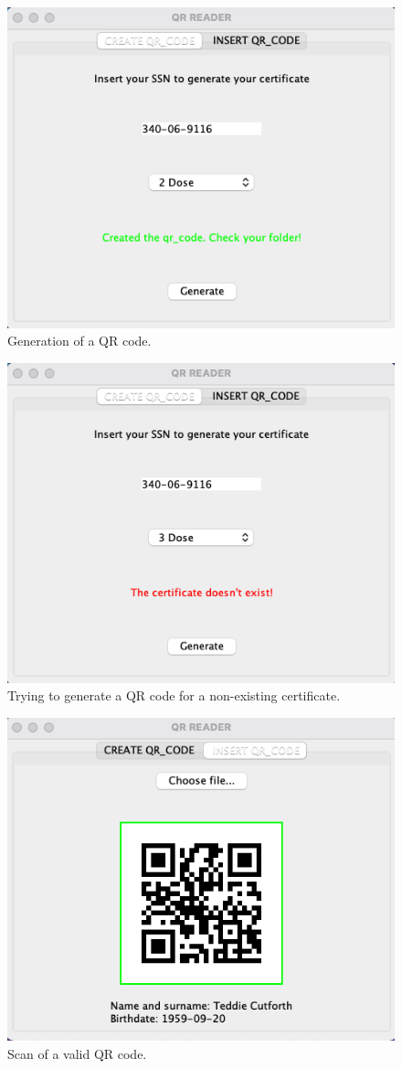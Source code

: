 \documentclass[12pt, a4paper]{article}
\begin{document}
\begin{figure}[ht]
    \centering
    \includegraphics[width=.6\linewidth]{app_1.png}
    \caption*{Generation of a QR code.} %
\end{figure}
\vspace{2cm}
\begin{figure}[ht]
    \centering
    \includegraphics[width=.6\linewidth]{app_2.png}
    \caption*{Trying to generate a QR code for a non-existing certificate.} %
\end{figure}
\begin{figure}[ht]
    \centering
    \includegraphics[width=.6\linewidth]{app_3.png}
    \caption*{Scan of a valid QR code.} %
\end{figure}
\end{document}
